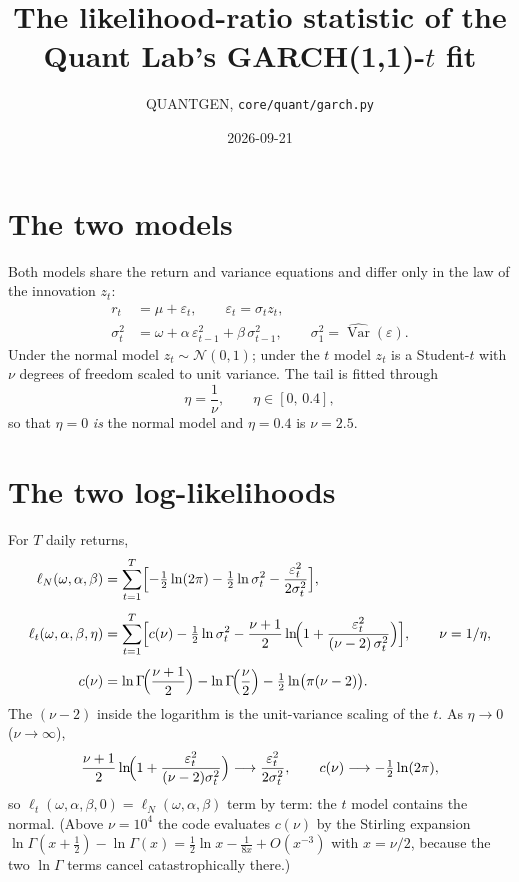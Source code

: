 \documentclass[11pt]{article}
\title{The likelihood-ratio statistic of the Quant Lab's GARCH(1,1)-$t$ fit}
\author{QUANTGEN, \texttt{core/quant/garch.py}}
\date{2026-09-21}
\begin{document}
\maketitle

\section*{The two models}

Both models share the return and variance equations and differ only in the law of the innovation $z_t$:
\begin{align}
  r_t &= \mu + \varepsilon_t, \qquad \varepsilon_t = \sigma_t z_t, \\
  \sigma_t^2 &= \omega + \alpha\,\varepsilon_{t-1}^2 + \beta\,\sigma_{t-1}^2,
  \qquad \sigma_1^2 = \widehat{\operatorname{Var}}(\varepsilon).
\end{align}
Under the normal model $z_t \sim \mathcal N(0,1)$; under the $t$ model $z_t$ is a Student-$t$ with $\nu$ degrees of freedom scaled to unit variance. The tail is fitted through
\begin{equation}
  \eta = \frac{1}{\nu}, \qquad \eta \in [0,\,0.4],
\end{equation}
so that $\eta = 0$ \emph{is} the normal model and $\eta = 0.4$ is $\nu = 2.5$.

\section*{The two log-likelihoods}

For $T$ daily returns,
\begin{align}
  \ell_N(\omega,\alpha,\beta)
    &= \sum_{t=1}^{T}\Bigl[-\tfrac12\ln(2\pi) - \tfrac12\ln\sigma_t^2 - \frac{\varepsilon_t^2}{2\sigma_t^2}\Bigr], \\[4pt]
  \ell_t(\omega,\alpha,\beta,\eta)
    &= \sum_{t=1}^{T}\Bigl[c(\nu) - \tfrac12\ln\sigma_t^2
       - \frac{\nu+1}{2}\ln\!\Bigl(1 + \frac{\varepsilon_t^2}{(\nu-2)\,\sigma_t^2}\Bigr)\Bigr],
       \qquad \nu = 1/\eta, \\[4pt]
  c(\nu) &= \ln\Gamma\!\Bigl(\frac{\nu+1}{2}\Bigr) - \ln\Gamma\!\Bigl(\frac{\nu}{2}\Bigr)
            - \tfrac12\ln\bigl(\pi(\nu-2)\bigr).
\end{align}
The $(\nu-2)$ inside the logarithm is the unit-variance scaling of the $t$. As $\eta \to 0$ ($\nu \to \infty$),
\begin{equation}
  \frac{\nu+1}{2}\ln\!\Bigl(1 + \frac{\varepsilon_t^2}{(\nu-2)\sigma_t^2}\Bigr) \longrightarrow \frac{\varepsilon_t^2}{2\sigma_t^2},
  \qquad c(\nu) \longrightarrow -\tfrac12\ln(2\pi),
\end{equation}
so $\ell_t(\omega,\alpha,\beta,0) = \ell_N(\omega,\alpha,\beta)$ term by term: the $t$ model contains the normal. (Above $\nu = 10^4$ the code evaluates $c(\nu)$ by the Stirling expansion $\ln\Gamma(x+\tfrac12)-\ln\Gamma(x) = \tfrac12\ln x - \tfrac{1}{8x} + O(x^{-3})$ with $x=\nu/2$, because the two $\ln\Gamma$ terms cancel catastrophically there.)
\end{document}
